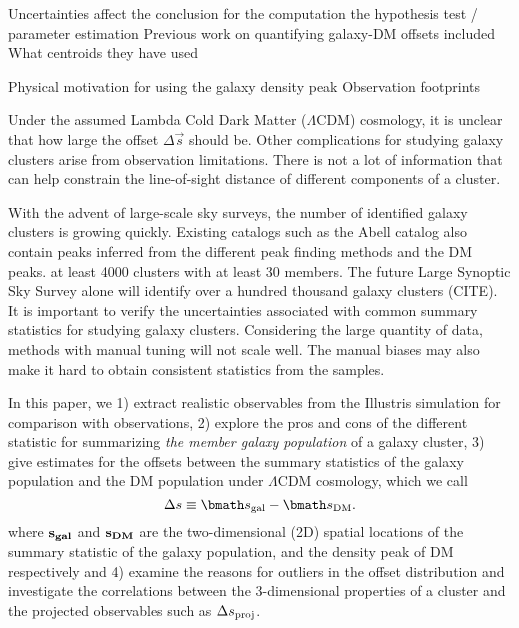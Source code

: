 Uncertainties affect the conclusion for the computation the hypothesis test / parameter
estimation
Previous work on quantifying galaxy-DM offsets included  
What centroids they have used

Physical motivation for using the galaxy density peak 
Observation footprints 

Under the assumed Lambda Cold Dark Matter ($\Lambda$CDM) cosmology, it is unclear 
that how large the offset $\Delta \vec{s}$ should be. 
Other complications for studying galaxy clusters arise from observation
limitations. There is not a lot of information that can help constrain the  
line-of-sight distance of different components of a cluster. 


With the advent of large-scale sky surveys, 
the number of identified galaxy clusters is growing quickly. 
Existing catalogs such as the Abell catalog also contain
peaks inferred
from the different peak finding methods and the DM peaks. 
at least 4000 clusters with at least 30 members. 
The future Large Synoptic Sky Survey alone will identify over a hundred thousand galaxy
clusters (CITE). It is important to verify the uncertainties associated with common
summary statistics for studying galaxy clusters. Considering the large quantity
of data, methods with manual tuning will not scale well. The manual biases may
also make it hard to 
obtain consistent statistics from the samples.

In this paper, we 
1) extract realistic observables from the Illustris simulation for
comparison with observations, 2) explore the pros and cons of the different statistic for 
summarizing {\it the member galaxy population} of a galaxy cluster, 3)	
give estimates for the offsets between the summary statistics of the galaxy  
population and the DM population under $\Lambda$CDM cosmology, which we call 
\begin{equation}
	\Delta s \equiv \vec{s}_{\rm gal} - \vec{s}_{\rm DM}.
\end{equation}
where $\bf{s}_{gal}$ and $\bf{s}_{DM}$ are the two-dimensional (2D) spatial
locations of the summary statistic of the galaxy population, and the density
peak of DM respectively and 4) examine the reasons for outliers in 
the offset distribution and investigate the  
correlations between the 3-dimensional properties of a cluster and the projected 
observables such as $\Delta s_{\rm proj}$.

